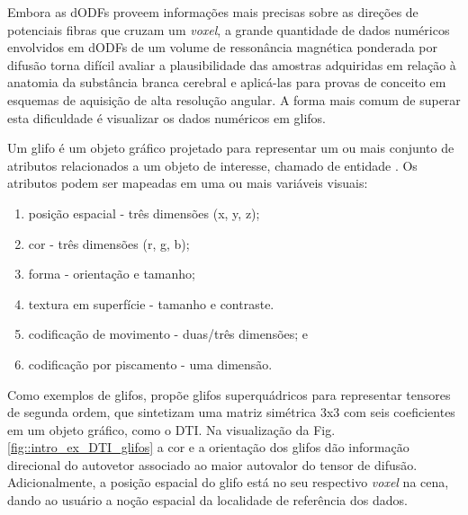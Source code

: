 \documentclass[
    12pt,                %
    oneside,            %
    a4paper,            %
    english,            %
    french,                %
    spanish,            %
    brazil                %
    ]{abntex2}
\begin{document}

Embora as dODFs proveem informações mais precisas sobre as direções de potenciais fibras que cruzam um \textit{voxel}, a grande quantidade de dados numéricos envolvidos em dODFs de um volume de ressonância magnética ponderada por difusão torna difícil avaliar a plausibilidade das amostras adquiridas em relação à anatomia da substância branca cerebral e aplicá-las para provas de conceito em esquemas de aquisição de alta resolução angular. A forma mais comum de superar esta dificuldade é visualizar os dados numéricos em glifos. 


Um glifo é um objeto gráfico projetado para representar um ou mais conjunto de atributos relacionados a um objeto de interesse, chamado de entidade \cite{ware2004}. Os atributos podem ser mapeadas em uma ou mais variáveis visuais:

\begin{enumerate}
    \item posição espacial -  três dimensões (x, y, z);
    \item cor - três dimensões (r, g, b);
    \item forma - orientação e tamanho;
    \item textura em superfície - tamanho e contraste.
    \item codificação de movimento - duas/três dimensões; e
    \item codificação por piscamento - uma dimensão.
\end{enumerate}

Como exemplos de glifos,  propõe glifos superquádricos para representar tensores de segunda ordem, que sintetizam uma matriz simétrica 3x3 com seis coeficientes em um objeto gráfico, como o DTI. Na visualização da Fig. \ref{fig::intro_ex_DTI_glifos} a cor e a orientação dos glifos dão informação direcional do autovetor associado ao maior autovalor do tensor de difusão. Adicionalmente, a posição espacial do glifo está no seu respectivo \textit{voxel} na cena, dando ao usuário a noção espacial da localidade de referência dos dados.
\end{document}
